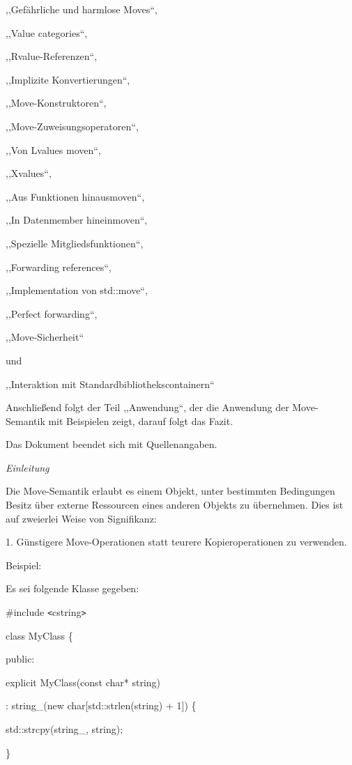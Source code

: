 \documentclass{article}
\begin{document}
,,Gefährliche und harmlose Moves``,

,,Value categories``,

,,Rvalue-Referenzen``,

,,Implizite Konvertierungen``,

,,Move-Konstruktoren``,

,,Move-Zuweisungsoperatoren``,

,,Von Lvalues moven``,

,,Xvalues``,

,,Aus Funktionen hinausmoven``,

,,In Datenmember hineinmoven``,

,,Spezielle Mitgliedsfunktionen``,

,,Forwarding references``,

,,Implementation von std::move``,

,,Perfect forwarding``,

,,Move-Sicherheit``

und

,,Interaktion mit Standardbibliothekscontainern``

Anschließend folgt der Teil ,,Anwendung``, der die Anwendung der Move-Semantik 
mit Beispielen zeigt, darauf folgt das Fazit.

Das Dokument beendet sich mit Quellenangaben.

\vspace{51pt}
\emph{Einleitung}

Die Move-Semantik erlaubt es einem Objekt, unter bestimmten Bedingungen Besitz 
über externe Ressourcen eines anderen Objekts zu übernehmen. Dies ist auf zweierlei 
Weise von Signifikanz:

1. Günstigere Move-Operationen statt teurere Kopieroperationen zu verwenden.

Beispiel:

Es sei folgende Klasse gegeben:

\vspace{12pt}
\#include \texttt{<}cstring\texttt{>}

\vspace{12pt}
class MyClass \{

public:    

\parindent=14pt
explicit MyClass(const char* string)        

\parindent=28pt
: string\_(new char[std::strlen(string) + 1]) \{        

std::strcpy(string\_, string);    

\parindent=43pt
\}    
\end{document}
